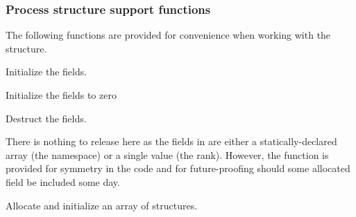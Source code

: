\subsubsection{Process structure support functions}

The following functions are provided for convenience when working with the  structure.


Initialize the  fields.


\begin{arglist}
\end{arglist}

\descr

Initialize the fields to zero


Destruct the  fields.


\begin{arglist}
\end{arglist}

There is nothing to release here as the fields in  are either a statically-declared array (the namespace) or a single value (the rank). However, the function is provided for symmetry in the code and for future-proofing should some allocated field be included some day.


Allocate and initialize an array of  structures.


\begin{arglist}
\end{arglist}

